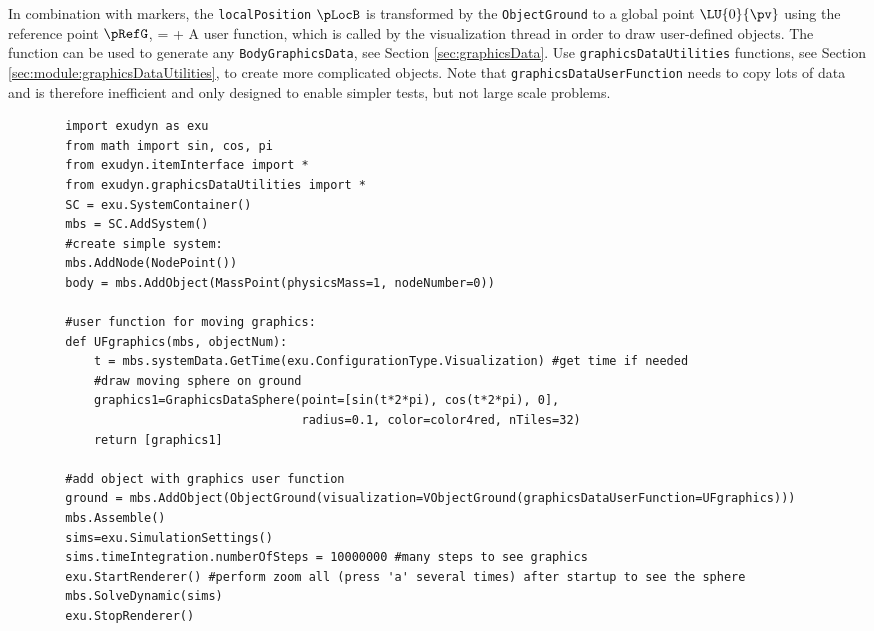     In combination with markers, the \texttt{localPosition} $\pLocB$ is transformed by the \texttt{ObjectGround} to
    a global point $\LU{0}{\pv}$ using the reference point $\pRefG$,
    \be
       = \pRefG +  \pLocB \eqDot
    \ee
    A user function, which is called by the visualization thread in order to draw user-defined objects.
    The function can be used to generate any \texttt{BodyGraphicsData}, see Section \ref{sec:graphicsData}.
    Use \texttt{graphicsDataUtilities} functions, see Section \ref{sec:module:graphicsDataUtilities}, to create more complicated objects. 
    Note that \texttt{graphicsDataUserFunction} needs to copy lots of data and is therefore
    inefficient and only designed to enable simpler tests, but not large scale problems.
    \finishTable
    \userFunctionExample{}
    \pythonstyle\begin{lstlisting}
        import exudyn as exu
        from math import sin, cos, pi
        from exudyn.itemInterface import *
        from exudyn.graphicsDataUtilities import *
        SC = exu.SystemContainer()
        mbs = SC.AddSystem()
        #create simple system:
        mbs.AddNode(NodePoint())
        body = mbs.AddObject(MassPoint(physicsMass=1, nodeNumber=0))
        
        #user function for moving graphics:
        def UFgraphics(mbs, objectNum):
            t = mbs.systemData.GetTime(exu.ConfigurationType.Visualization) #get time if needed
            #draw moving sphere on ground
            graphics1=GraphicsDataSphere(point=[sin(t*2*pi), cos(t*2*pi), 0], 
                                         radius=0.1, color=color4red, nTiles=32)
            return [graphics1] 

        #add object with graphics user function
        ground = mbs.AddObject(ObjectGround(visualization=VObjectGround(graphicsDataUserFunction=UFgraphics)))
        mbs.Assemble()
        sims=exu.SimulationSettings()
        sims.timeIntegration.numberOfSteps = 10000000 #many steps to see graphics
        exu.StartRenderer() #perform zoom all (press 'a' several times) after startup to see the sphere
        mbs.SolveDynamic(sims)
        exu.StopRenderer()
    \end{lstlisting}
